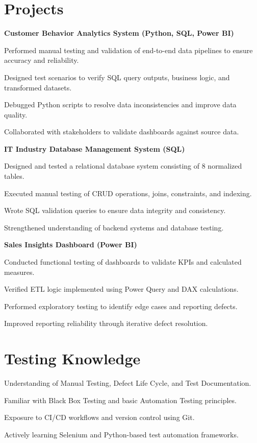 \documentclass[letterpaper,10pt]{article}
\newenvironment{resume_list}{
  \vspace{-4pt}\begin{itemize}[itemsep=-2pt, leftmargin=18pt]
}{
  \end{itemize}
}
\begin{document}
\section*{Projects}

\textbf{Customer Behavior Analytics System (Python, SQL, Power BI)}  
\begin{resume_list}
  \item Performed manual testing and validation of end-to-end data pipelines to ensure accuracy and reliability.
  \item Designed test scenarios to verify SQL query outputs, business logic, and transformed datasets.
  \item Debugged Python scripts to resolve data inconsistencies and improve data quality.
  \item Collaborated with stakeholders to validate dashboards against source data.
\end{resume_list}

\textbf{IT Industry Database Management System (SQL)}  
\begin{resume_list}
  \item Designed and tested a relational database system consisting of 8 normalized tables.
  \item Executed manual testing of CRUD operations, joins, constraints, and indexing.
  \item Wrote SQL validation queries to ensure data integrity and consistency.
  \item Strengthened understanding of backend systems and database testing.
\end{resume_list}

\textbf{Sales Insights Dashboard (Power BI)}  
\begin{resume_list}
  \item Conducted functional testing of dashboards to validate KPIs and calculated measures.
  \item Verified ETL logic implemented using Power Query and DAX calculations.
  \item Performed exploratory testing to identify edge cases and reporting defects.
  \item Improved reporting reliability through iterative defect resolution.
\end{resume_list}

\section*{Testing Knowledge}
\begin{resume_list}
  \item Understanding of Manual Testing, Defect Life Cycle, and Test Documentation.
  \item Familiar with Black Box Testing and basic Automation Testing principles.
  \item Exposure to CI/CD workflows and version control using Git.
  \item Actively learning Selenium and Python-based test automation frameworks.
\end{resume_list}
\end{document}
